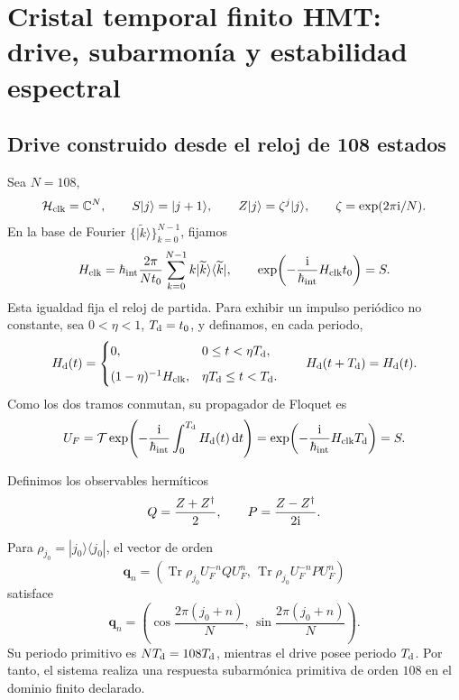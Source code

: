 \section{Cristal temporal finito HMT: drive, subarmonía y estabilidad espectral}
\label{sec:hmtf2-cristal-temporal}

\subsection{Drive construido desde el reloj de 108 estados}

Sea \(N=108\),
\[
 \mathcal H_{\rm clk}=\mathbb C^N,\qquad
 S|j\rangle=|j+1\rangle,\qquad
 Z|j\rangle=\zeta^j|j\rangle,\qquad
 \zeta=\exp(2\pi{\rm i}/N).
\]
En la base de Fourier \(\{|\widetilde k\rangle\}_{k=0}^{N-1}\), fijamos
\[
 H_{\rm clk}
 =\hbar_{\rm int}\frac{2\pi}{Nt_0}
 \sum_{k=0}^{N-1}k|\widetilde k\rangle\langle\widetilde k|,
 \qquad
 \exp\!\left(-\frac{{\rm i}}{\hbar_{\rm int}}H_{\rm clk}t_0\right)=S.
\]
Esta igualdad fija el reloj de partida. Para exhibir un impulso periódico no
constante, sea \(0<\eta<1\), \(T_{\rm d}=t_0\), y
definamos, en cada periodo,
\[
 H_{\rm d}(t)=
 \begin{cases}
  0,&0\leq t<\eta T_{\rm d},\\[2mm]
  (1-\eta)^{-1}H_{\rm clk},
  &\eta T_{\rm d}\leq t<T_{\rm d}.
 \end{cases}
 \qquad H_{\rm d}(t+T_{\rm d})=H_{\rm d}(t).
\]
Como los dos tramos conmutan, su propagador de Floquet es
\[
 U_F
 =\mathcal T\exp\!\left(
 -\frac{{\rm i}}{\hbar_{\rm int}}\int_0^{T_{\rm d}}H_{\rm d}(t)\,\mathrm dt
 \right)
 =\exp\!\left(-\frac{{\rm i}}{\hbar_{\rm int}}H_{\rm clk}T_{\rm d}\right)
 =S.
\]

Definimos los observables hermíticos
\[
 Q=\frac{Z+Z^\dagger}{2},
 \qquad
 P=\frac{Z-Z^\dagger}{2{\rm i}}.
\]

\begin{theorem}
\label{thm:hmtf2-subarmonia-108}
Para \(\rho_{j_0}=|j_0\rangle\langle j_0|\), el vector de orden
\[
 \mathbf q_n
 =\left(
 \operatorname{Tr}\rho_{j_0}U_F^{-n}QU_F^n,\,
 \operatorname{Tr}\rho_{j_0}U_F^{-n}PU_F^n
 \right)
\]
satisface
\[
 \mathbf q_n
 =\left(
 \cos\frac{2\pi(j_0+n)}N,\,
 \sin\frac{2\pi(j_0+n)}N
 \right).
\]
Su periodo primitivo es \(N T_{\rm d}=108T_{\rm d}\), mientras el drive
posee periodo \(T_{\rm d}\). Por tanto, el sistema realiza una respuesta
subarmónica primitiva de orden \(108\) en el dominio finito declarado.
\end{theorem}

